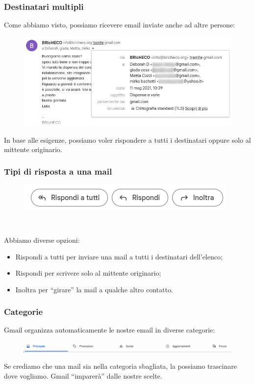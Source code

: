 \documentclass[handout]{beamer}
\begin{document}
\begin{frame}
\frametitle{Destinatari multipli}
Come abbiamo visto, possiamo ricevere email inviate anche ad altre persone:
\begin{figure}
  \includegraphics[width=.8\columnwidth]{img/gmaildestinatari.png}
\end{figure}\pause
In base alle esigenze, possiamo voler rispondere a tutti i destinatari oppure solo al mittente originario.
\end{frame}






\begin{frame}
\frametitle{Tipi di risposta a una mail}
\begin{figure}
  \includegraphics[width=.7\columnwidth]{img/risposte.png}
\end{figure}

~

Abbiamo diverse opzioni:
\begin{itemize}
  \item \alert{Rispondi a tutti} per inviare una mail a tutti i destinatari dell'elenco;\pause
  \item \alert{Rispondi} per scrivere solo al mittente originario;\pause
  \item \alert{Inoltra} per ``girare'' la mail a qualche altro contatto.
\end{itemize}
\end{frame}



\begin{frame}
\frametitle{Categorie}
Gmail organizza automaticamente le nostre email in diverse categorie:
\begin{figure}
  \includegraphics[width=\columnwidth]{img/gmailcategorie.png}
\end{figure}\pause

Se crediamo che una mail sia nella categoria sbagliata, la possiamo trascinare dove vogliamo. Gmail ``imparerà'' dalle nostre scelte.
\end{frame}
\end{document}
